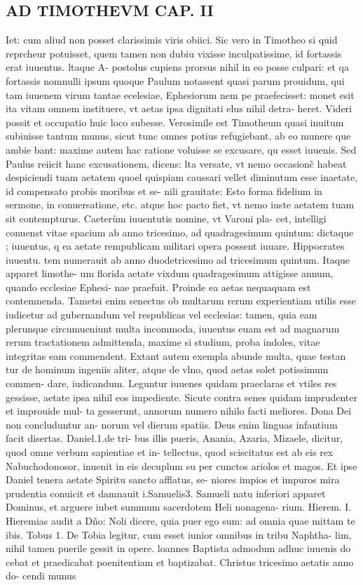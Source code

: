 \documentclass{article}
\begin{document}
\begin{pages}
\section*{AD TIMOTHEVM CAP. II }
\marginpar{[ p.99 ]}\pstart Iet: cum aliud non posset clarissimis viris obiici. Sic vero in Timotheo si quid reprcheur potuisset, quem tamen non dubiu vixisse inculpatissime, id fortassis erat iuuentus. ltaque A- postolus cupiens prorsus nihil in eo posse culpari: et qa fortassis nomnulli ipsum quoque  Paulum notassent quasi parum prouidum, qui tam iuuenem virum tantae ecelesiae, Ephesiorum nem pe praefecisset: monet esit ita vitam omnem instituere, vt aetas ipsa dignitati elus nihil detra- heret. Videri possit et occupatio huic loco subesse. Verosimile est Timotheum quasi inuitum subiuisse tantum munus, sicut tunc omnes potius refugiebant, ab eo munere que ambie bant: maxime autem hac ratione voluisse se excusare, qu esset iuuenis. Sed Paulus reiicit hanc excusationem, dicens: lta versate, vt nemo occasionc̃ habeat despiciendi tuam aetatem quoel quispiam caussari vellet diminutum esse inaetate, id compensato probis moribus et se- nili grauitate: Esto forma fidelium in sermone, in conuersatione, etc. atque hoc pacto fiet, vt nemo iuste aetatem tuam sit contempturus. Caeterùm iuuentutis nomine, vt Varoni pla- cet, intelligi conuenst vitae spacium ab anno tricesimo, ad quadragesimum quintum: dictaque ; iuuentus, q ea aetate rempublicam militari opera possent iuuare. Hippocrates iuuentu. tem numerauit ab anno duodetricesimo ad tricesimum quintum. Itaque apparet limothe- um florida aetate vixdum quadragesimum attigisse annum, quando ecclesiae Ephesi- nae praefuit. Proinde ea aetas nequaquam est contemnenda. Tametsi enim senectus ob multarum rerum experientiam utilis esse iudicetur ad gubernandum vel respublicas vel ecclesias: tamen, quia eam plerunque circumueniunt multa incommoda, iuuentus euam est ad magnarum rerum tractationem admittenda, maxime si studium, proba indoles, vitae integritas eam commendent. Extant autem exempla abunde multa, quae testan tur de hominum ingeniis aliter, atque de vlno, quod aetas solet potissimum commen- dare, iudicandum. Leguntur iuuenes quidam praeclaras et vtiles res gessisse, aetate ipsa nihil eos impediente. Sicute contra senes quidam imprudenter et improuide mul- ta gesserunt, annorum numero nihilo facti meliores. Dona Dei non concluduntur an- norum vel dierum spatiis. Deus enim linguas infantium facit disertas. Daniel.1.de tri- bus illis pueris, Anania, Azaria, Mizaele, dicitur, quod omne verbum sapientiae et in- tellectus, quod sciscitatus est ab eis rex Nabuchodonosor, inuenit in eis decuplum su per cunctos ariolos et magos. Et ipse Daniel tenera aetate Spiritu sancto afflatus, se- niores impios et impuros mira prudentia conuicit et damnauit i.Samuelis3. Samueli natu inferiori apparet Dominus, et arguere iubet summum sacerdotem Heli nonagena- rium. Hierem. I. Hieremias audit a Dño: Noli dicere, quia puer ego sum: ad omnia quae mittam te ibis. Tobus 1. De Tobia legitur, cum esset iunior omnibus in tribu Naphtha- lim, nihil tamen puerile gessit in opere. loannes Baptista admodum adhuc iuuenis do cebat et praedicabat poenitentiam et baptizabat. Christus tricesimo aetatis anno do- cendi munus 
\end{pages}
\end{document}

